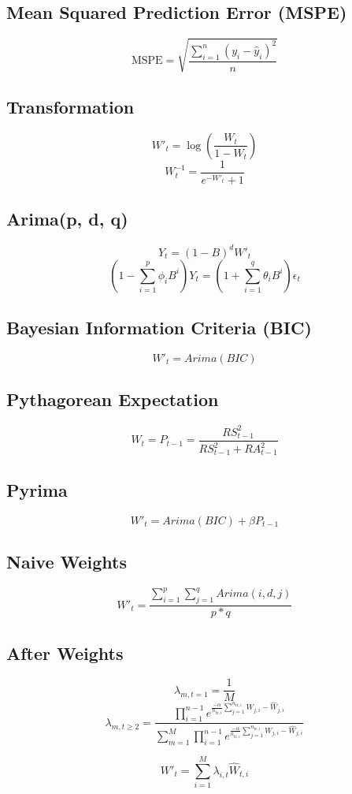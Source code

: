 \subsection{Mean Squared Prediction Error (MSPE)}

$$
\text{MSPE} = \sqrt{\frac{\sum_{i=1}^{n} (y_i - \hat{y}_i)^2}{n}}
$$

\subsection{Transformation}

$$
W'_t = \log(\frac{W_t}{1-W_t})
$$
$$
W_t^{-1} = \frac{1}{e^{-W'_t} + 1}
$$

\subsection{Arima(p, d, q)}
$$ 
Y_t = (1-B)^d W'_t 
$$
$$ 
(1 - \sum_{i=1}^{p} \phi_i B^i) Y_t = 
(1 + \sum_{i=1}^{q} \theta_i B^i) \epsilon_t
$$

\subsection{Bayesian Information Criteria (BIC)}
$$
W'_t = Arima(BIC)
$$

\subsection{Pythagorean Expectation}
$$
W_t = P_{t-1} = \frac{RS_{t-1}^2}{RS_{t-1}^2 + RA_{t-1}^2}
$$

\subsection{Pyrima}
$$
W'_t = Arima(BIC) + \beta P_{t-1}
$$

\subsection{Naive Weights}
$$
W'_t = \frac{\sum_{i=1}^p \sum_{j=1}^q Arima(i, d, j)}{p*q}
$$

\subsection{After Weights}
$$
\lambda_{m, t=1} = \frac{1}{M}
$$
$$
\lambda_{m, t\geq2} = 
\frac
{
\prod_{i=1}^{n-1} e^{\frac{-\alpha}{n_{\text{tr}, i}} 
\sum_{j=1}^{n_{\text{tr}, i}} W_{j,i}-\hat{W}_{j,i}}
}
{
\sum_{m=1}^{M}
\prod_{i=1}^{n-1} e^{\frac{-\alpha}{n_{\text{tr}, i}} 
\sum_{j=1}^{n_{\text{tr}, i}} W_{j,i}-\hat{W}_{j,i}}
}
$$

$$
W'_{t} = \sum_{i=1}^{M} \lambda_{i, t} \hat{W}_{t,i}
$$